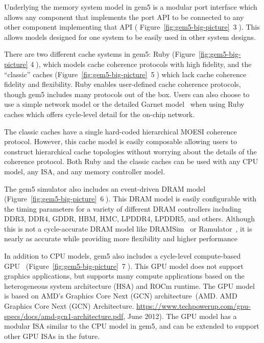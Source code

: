 Underlying the memory system model in gem5 is a modular port interface which allows any component that implements the port API to be connected to any other component implementing that API ( Figure~\ref{fig:gem5-big-picture}~\textcircled{3}).
This allows models designed for one system to be easily used in other system designs.

There are two different cache systems in gem5: Ruby (Figure~\ref{fig:gem5-big-picture} \textcircled{4}), which models cache coherence protocols with high fidelity, and the ``classic'' caches (Figure~\ref{fig:gem5-big-picture}~\textcircled{5}) which lack cache coherence fidelity and flexibility.
Ruby enables user-defined cache coherence protocols, though gem5 includes many protocols out of the box.
Users can also choose to use a simple network model or the detailed Garnet model~\cite{garnet-2} when using Ruby caches which offers cycle-level detail for the on-chip network.

The classic caches have a single hard-coded hierarchical MOESI coherence protocol.
However, this cache model is easily composable allowing users to construct hierarchical cache topologies without worrying about the details of the coherence protocol.
Both Ruby and the classic caches can be used with any CPU model, any ISA, and any memory controller model.

The gem5 simulator also includes an event-driven DRAM model (Figure~\ref{fig:gem5-big-picture}~\textcircled{6}).
This DRAM model is easily configurable with the timing parameters for a variety of different DRAM controllers including DDR3, DDR4, GDDR, HBM, HMC, LPDDR4, LPDDR5, and others.
Although this is not a cycle-accurate DRAM model like DRAMSim~\cite{wang_05, dramsim2, dramsim3} or Ramulator~\cite{yoongy_16}, it is nearly as accurate while providing more flexibility and higher performance~\cite{hansson-ispass-paper}

In addition to CPU models, gem5 also includes a cycle-level compute-based GPU~\cite{} (Figure~\ref{fig:gem5-big-picture}~\textcircled{7}).
This GPU model does not support graphics applications, but supports many compute applications based on the heterogeneous system architecture (HSA) and ROCm runtime.
The GPU model is based on AMD's Graphics Core Next (GCN) architecture~\cite{}(AMD. AMD Graphics Core Next (GCN) Architecture. \url{https://www.techpowerup.com/gpu-specs/docs/amd-gcn1-architecture.pdf}, June 2012).
The GPU model has a modular ISA similar to the CPU model in gem5, and can be extended to support other GPU ISAs in the future.

